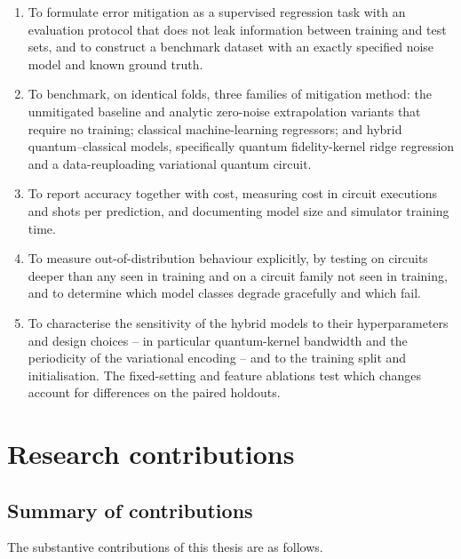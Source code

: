 \documentclass[Thesis.tex]{subfiles}
\begin{document}
\begin{enumerate}
    \item To formulate error mitigation as a supervised regression task with an
    evaluation protocol that does not leak information between training and test
    sets, and to construct a benchmark dataset with an exactly specified noise model
    and known ground truth.

    \item To benchmark, on identical folds, three families of mitigation method: the
    unmitigated baseline and analytic zero-noise extrapolation variants that require
    no training; classical machine-learning regressors; and hybrid
    quantum--classical models, specifically quantum fidelity-kernel ridge regression
    and a data-reuploading variational quantum circuit.

    \item To report accuracy together with cost, measuring cost in circuit
    executions and shots per prediction, and documenting model size and simulator
    training time.

    \item To measure out-of-distribution behaviour explicitly, by testing on circuits
    deeper than any seen in training and on a circuit family not seen in training,
    and to determine which model classes degrade gracefully and which fail.

    \item To characterise the sensitivity of the hybrid models to their
    hyperparameters and design choices -- in particular quantum-kernel bandwidth and
    the periodicity of the variational encoding -- and to the training split and
    initialisation. The fixed-setting and feature ablations test which changes
    account for differences on the paired holdouts.

\end{enumerate}

\section{Research contributions}

\subsection{Summary of contributions}

The substantive contributions of this thesis are as follows.
\end{document}
